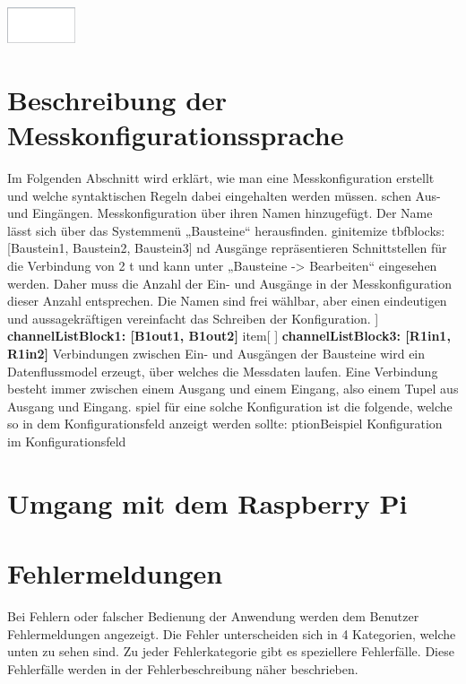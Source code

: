 \documentclass[parskip=full]{scrartcl}
\begin{document}
\begin{flushleft}
    \includegraphics[width = 2cm]{Grafiken/14-Datenanzeige.png}
\end{flushleft}

\section{Beschreibung der Messkonfigurationssprache}


Im Folgenden Abschnitt wird erklärt, wie man eine Messkonfiguration erstellt und welche syntaktischen Regeln dabei eingehalten werden müssen.  
schen Aus- und Eingängen.  
 Messkonfiguration über ihren Namen hinzugefügt. Der Name lässt sich über das Systemmenü „Bausteine“ herausfinden.   
gin{itemize}
tbf{blocks: [Baustein1, Baustein2, Baustein3]}
nd Ausgänge repräsentieren Schnittstellen für die Verbindung von 2  
t und kann unter „Bausteine -> Bearbeiten“ eingesehen werden. Daher muss die Anzahl der Ein- und Ausgänge in der Messkonfiguration dieser Anzahl entsprechen. Die Namen sind frei wählbar, aber einen eindeutigen und aussagekräftigen vereinfacht das Schreiben der Konfiguration.  
 ] \textbf{channelListBlock1: [B1out1, B1out2]}
item[ ] \textbf{channelListBlock3: [R1in1, R1in2]} 
 Verbindungen zwischen Ein- und Ausgängen der Bausteine wird ein Datenflussmodel erzeugt, über welches die Messdaten laufen.  Eine Verbindung besteht immer zwischen einem Ausgang und einem Eingang, also einem Tupel aus Ausgang und Eingang.   
spiel für eine solche Konfiguration ist die folgende, welche so in dem Konfigurationsfeld anzeigt werden sollte:
ption{Beispiel Konfiguration im Konfigurationsfeld}


\section{Umgang mit dem Raspberry Pi}

\section{Fehlermeldungen}

Bei Fehlern oder falscher Bedienung der Anwendung werden dem Benutzer Fehlermeldungen angezeigt. Die Fehler unterscheiden sich in 4 Kategorien, welche unten zu sehen sind. Zu jeder Fehlerkategorie gibt es speziellere Fehlerfälle. Diese Fehlerfälle werden in der Fehlerbeschreibung näher beschrieben.
\end{document}

